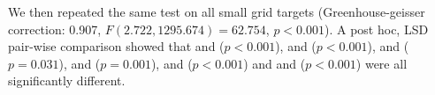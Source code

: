 We then repeated the same test on all small grid targets (Greenhouse-geisser correction: 0.907, $F(2.722, 1295.674)=62.754$, $p<0.001$). A post hoc, LSD pair-wise comparison showed that \pinch and \swipe ($p<0.001$), \pinch and \throw ($p<0.001$), \pinch and \tilt ($p=0.031$), \swipe and \throw ($p=0.001$), \swipe and \tilt ($p<0.001$) and \throw and \tilt ($p<0.001$) were all significantly different. 